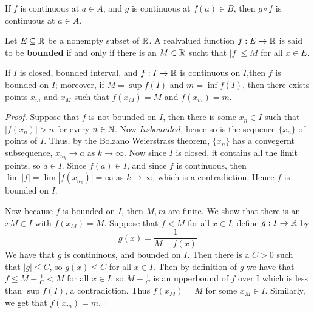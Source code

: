 \begin{corollary}
    If $f$ is continuous at $a \in A$, and $g$ is continuous at $f(a) \in B$, 
    then $g \circ f$ is continuous at $a \in A$.
\end{corollary}

\begin{definition}
    Let $E \subseteq \mathbb{R}$ be a nonempty subset of $\mathbb{R}$. A realvalued function $f:E \rightarrow \mathbb{R}$ 
    is said to be \textbf{bounded} if and only if there is an $M \in \mathbb{R}$ sucht that 
    $|f| \leq M$ for all  $x \in E$.
\end{definition}

\begin{theorem}\label{3.3.4}
    If $I$ is closed, bounded interval, and  $f:I \rightarrow \mathbb{R}$ is continuous 
    on  $I$,then  $f$ is bounded on  $I$; moreover, if $M=\sup{f(I)}$ and 
    $m=\inf{f(I)}$, then there exists points $x_m$ and  $x_M$ such that
    $f(x_M)=M$ and  $f(x_m)=m$.
\end{theorem}
\begin{proof}
    Suppose that $f$ is not bounded on  $I$, then there is some  $x_n \in I$ 
    such that $|f(x_n)|>n$ for every $n \in \mathbb{N}$. Now $I is bounded$, hence so 
    is the sequence $\{x_n\}$ of points of  $I$. Thus, by the Bolzano Weierstrass 
    theorem,  $\{x_n\}$ has a convegernt subsequence, $x_{n_k} \rightarrow a$ 
    as $k \rightarrow \infty$. Now since  $I$ is closed, it contains all the 
    limit points, so  $a \in I$. Since  $f(a) \in I$, and since  $f$ is continuous, 
    then  $\lim{|f|}=\lim{|f(x_{n_k})|}=\infty$ as  $k \rightarrow \infty$, which 
    is a contradiction. Hence $f$ is bounded on  $I$.

    Now because  $f$ is bounded on $I$, then $M,m$ are finite. We show that 
    there is an $xM \in I$ with $f(x_M)=M$. Suppose that  $f<M$ for all  $x \in I$, 
    define  $g:I \rightarrow \mathbb{R}$ by
        \begin{equation*}
            g(x)=\frac{1}{M-f(x)}
        \end{equation*}
    We have that $g$ is contininous, and bounded on $I$. Then there is a  $C>0$ 
    such that  $|g| \leq C$, so $g(x) \leq C$ for all  $x \in I$. Then by definition 
    of  $g$ we have that  $f \leq M-\frac{1}{C}<M$ for all $x \in I$, so  $M-\frac{1}{C}$ 
    is an upperbound of $f$ over I which is less than  $\sup{f(I)}$, a contradiction. 
    Thus  $f(x_M)=M$ for some  $x_M \in I$. Similarly, we get that  $f(x_m)=m$.
\end{proof}

